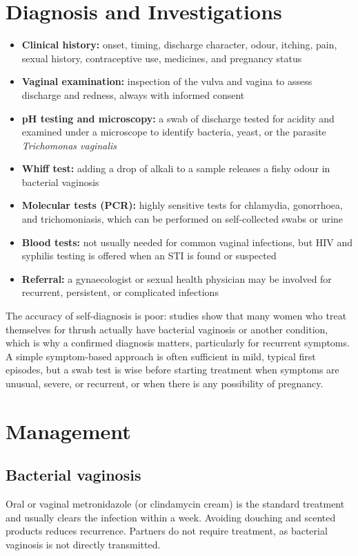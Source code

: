\section*{Diagnosis and Investigations}
\begin{itemize}
    \item \textbf{Clinical history:} onset, timing, discharge character, odour, itching, pain, sexual history, contraceptive use, medicines, and pregnancy status
    \item \textbf{Vaginal examination:} inspection of the vulva and vagina to assess discharge and redness, always with informed consent
    \item \textbf{pH testing and microscopy:} a swab of discharge tested for acidity and examined under a microscope to identify bacteria, yeast, or the parasite \textit{Trichomonas vaginalis}
    \item \textbf{Whiff test:} adding a drop of alkali to a sample releases a fishy odour in bacterial vaginosis
    \item \textbf{Molecular tests (PCR):} highly sensitive tests for chlamydia, gonorrhoea, and trichomoniasis, which can be performed on self-collected swabs or urine
    \item \textbf{Blood tests:} not usually needed for common vaginal infections, but HIV and syphilis testing is offered when an STI is found or suspected
    \item \textbf{Referral:} a gynaecologist or sexual health physician may be involved for recurrent, persistent, or complicated infections
\end{itemize}

The accuracy of self-diagnosis is poor: studies show that many women who treat themselves for thrush actually have bacterial vaginosis or another condition, which is why a confirmed diagnosis matters, particularly for recurrent symptoms. A simple symptom-based approach is often sufficient in mild, typical first episodes, but a swab test is wise before starting treatment when symptoms are unusual, severe, or recurrent, or when there is any possibility of pregnancy.

\section*{Management}
\subsection*{Bacterial vaginosis}
Oral or vaginal metronidazole (or clindamycin cream) is the standard treatment and usually clears the infection within a week. Avoiding douching and scented products reduces recurrence. Partners do not require treatment, as bacterial vaginosis is not directly transmitted.

